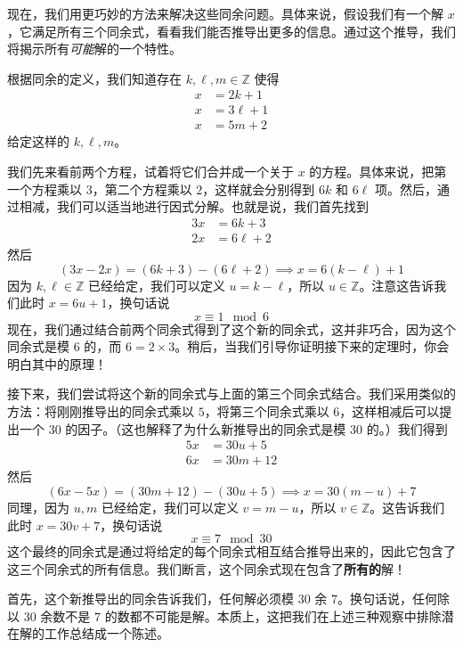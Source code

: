 现在，我们用更巧妙的方法来解决这些同余问题。具体来说，假设我们有一个解 $x$，它满足所有三个同余式，看看我们能否推导出更多的信息。通过这个推导，我们将揭示所有\emph{可能}解的一个特性。

根据同余的定义，我们知道存在 $k, \ell, m \in \mathbb{Z}$ 使得
\begin{align*}
    x &= 2k + 1 \\
    x &= 3\ell + 1 \\
    x &= 5m + 2 
\end{align*}
给定这样的 $k, \ell, m$。

我们先来看前两个方程，试着将它们合并成一个关于 $x$ 的方程。具体来说，把第一个方程乘以 $3$，第二个方程乘以 $2$，这样就会分别得到 $6k$ 和 $6\ell$ 项。然后，通过相减，我们可以适当地进行因式分解。也就是说，我们首先找到
\begin{align*}
    3x &= 6k + 3 \\
    2x &= 6\ell + 2
\end{align*}
然后
\[(3x - 2x) = (6k + 3) - (6\ell + 2) \implies x = 6(k - \ell) + 1\]
因为 $k, \ell \in \mathbb{Z}$ 已经给定，我们可以定义 $u = k-\ell$，所以 $u \in \mathbb{Z}$。注意这告诉我们此时 $x = 6u+1$，换句话说
\[x \equiv 1 \mod 6\]
现在，我们通过结合前两个同余式得到了这个新的同余式，这并非巧合，因为这个同余式是模 $6$ 的，而 $6 = 2 \times 3$。稍后，当我们引导你证明接下来的定理时，你会明白其中的原理！

接下来，我们尝试将这个新的同余式与上面的第三个同余式结合。我们采用类似的方法：将刚刚推导出的同余式乘以 $5$，将第三个同余式乘以 $6$，这样相减后可以提出一个 $30$ 的因子。（这也解释了为什么新推导出的同余式是模 $30$ 的。）我们得到
\begin{align*}
    5x &= 30u + 5 \\
    6x &= 30m + 12
\end{align*}
然后
\[(6x - 5x) = (30m + 12) - (30u + 5) \implies x = 30(m - u) + 7\]
同理，因为 $u,m$ 已经给定，我们可以定义 $v = m-u$，所以 $v \in \mathbb{Z}$。这告诉我们此时 $x = 30v+7$，换句话说
\[x \equiv 7 \mod 30\]
这个最终的同余式是通过将给定的每个同余式相互结合推导出来的，因此它包含了这三个同余式的所有信息。我们断言，这个同余式现在包含了\textbf{所有的}解！

首先，这个新推导出的同余告诉我们，任何解必须模 $30$ 余 $7$。换句话说，任何除以 $30$ 余数不是 $7$ 的数都不可能是解。本质上，这把我们在上述三种观察中排除潜在解的工作总结成一个陈述。

